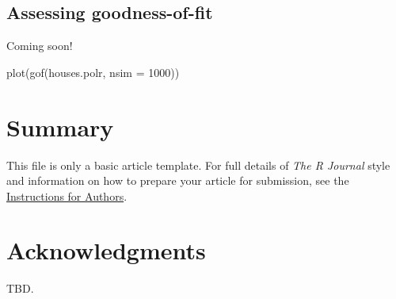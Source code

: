 \subsection{Assessing goodness-of-fit}

Coming soon!

\begin{example}
  plot(gof(houses.polr, nsim = 1000))
\end{example}


\section{Summary}

This file is only a basic article template. For full details of \emph{The R Journal} style and information on how to prepare your article for submission, see the \href{https://journal.r-project.org/share/author-guide.pdf}{Instructions for Authors}.


\section{Acknowledgments}

TBD.




\address{Author One\\
  Affiliation\\
  Address\\
  Country\\
  (ORCiD if desired)\\
  }

\address{Author Two\\
  Affiliation\\
  Address\\
  Country\\
  (ORCiD if desired)\\
  }

\address{Author Three\\
  Affiliation\\
  Address\\
  Country\\
  (ORCiD if desired)\\
  }
